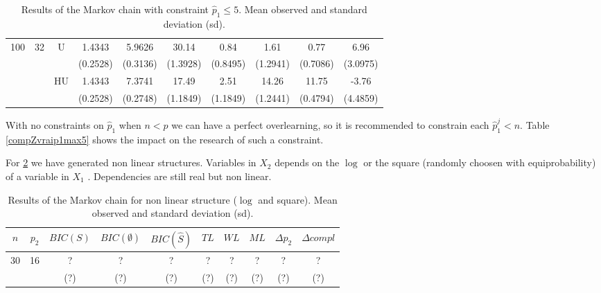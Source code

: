 \documentclass[11pt,a4paper]{article}
\begin{document}
\begin{table}[h!]
\begin{tabular}{|c|c|c|c|c|c|c|c|c|c|}
100 & 32 & U& 1.4343 & 5.9626 & 30.14 & 0.84 & 1.61 & 0.77 & 6.96  \\
& & & (0.2528) & (0.3136) & (1.3928) & (0.8495) & (1.2941) & (0.7086) & (3.0975) \\
 &  &HU & 1.4343 & 7.3741 & 17.49 & 2.51 & 14.26 & 11.75 & -3.76  \\
& & & (0.2528) & (0.2748) & (1.1849) & (1.1849) & (1.2441) & (0.4794) & (4.4859) \\
\hline
\end{tabular} 
\caption{Results of the Markov chain with  constraint $\hat{p}_1\leq 5$. Mean observed and standard deviation (sd). } \label{compZvrai}
\end{table}
With no constraints on $\hat{p}_1$ when $n<p$ we can have a perfect overlearning, so it is recommended to constrain each $\hat{p}_1^j <n$. Table \ref{compZvraip1max5} shows the impact on the research of such a constraint.


For  \ref{compZnonlin} we have generated non linear structures. Variables in $X_2$ depends on the $\log$ or the square (randomly choosen with equiprobability) of a variable in $X_1$ . Dependencies are still real but non linear.
\begin{table}[h!]
\centering
\begin{tabular}{|c|c|c|c|c|c|c|c|c|c|}
\hline
$n$ & $p_2$ &  $BIC(S)$ & $BIC(\emptyset)$ &$BIC(\hat{S})$  & $TL$ & $WL$ & $ML$ & $\Delta p_2$ & $\Delta compl$ \\
\hline
30 & 16 & ? & ? & ?  & ?  &?  & ?  & ? & ? \\
& &(?) & (?) & (?) & (?) & (?) & (?) & (?) & (?) \\
\hline
\end{tabular} 
\caption{Results of the Markov chain for non linear structure ($\log$ and square). Mean observed and standard deviation (sd). } \label{compZnonlin}
\end{table}

\clearpage
\end{document}

